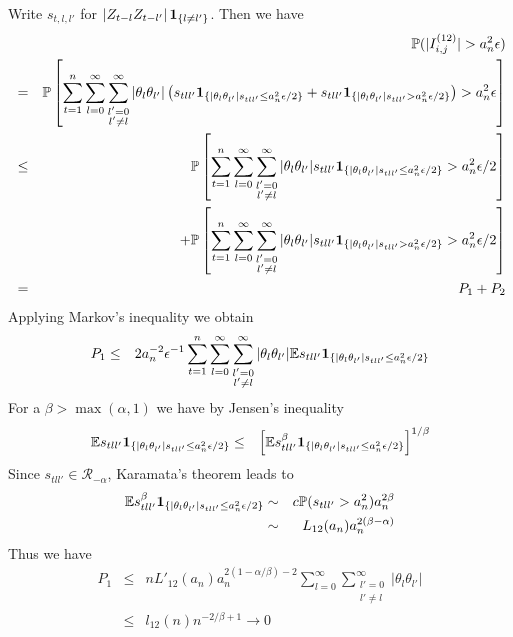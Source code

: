 \documentclass{article}
\begin{document}
Write $s_{t,l,l'}$ for $\left|Z_{t-l} Z_{t-l'}\right|\mathbf{1}_{\{l\neq
  l'\}}$. Then we have
\begin{eqnarray*}
  && \mathbb{P}(|I^{(12)}_{i,j}| > a_n^2 \epsilon) \\
  &=& \mathbb{P}\left[
    \sum_{t=1}^n \sum_{l=0}^\infty \sum_{\substack{l'=0 \\l'\neq
        l}}^\infty |\theta_l \theta_{l'}| \left(s_{tll'} \mathbf{1}_{\{|\theta_l \theta_{l'}|s_{tll'} \leq a_n^2
        \epsilon/2\}} + s_{tll'} \mathbf{1}_{\{|\theta_l \theta_{l'}|s_{tll'} > a_n^2
        \epsilon/2\}}\right) > a_n^2 \epsilon\right] \\
  &\leq& \mathbb{P}\left[
    \sum_{t=1}^n \sum_{l=0}^\infty \sum_{\substack{l'=0 \\l'\neq
        l}}^\infty |\theta_l \theta_{l'}|s_{tll'} \mathbf{1}_{\{|\theta_l \theta_{l'}|s_{tll'} \leq a_n^2 \epsilon/2\}} >
    a_n^2 \epsilon/2\right] \\
  && + \mathbb{P}\left[
    \sum_{t=1}^n \sum_{l=0}^\infty \sum_{\substack{l'=0 \\l'\neq
        l}}^\infty |\theta_l \theta_{l'}|s_{tll'} \mathbf{1}_{\{|\theta_l \theta_{l'}|s_{tll'} > a_n^2 \epsilon/2\}} >
    a_n^2 \epsilon/2\right] \\
  &=& P_1 + P_2
\end{eqnarray*}
Applying Markov's inequality we obtain
\begin{eqnarray*}
  P_1 &\leq& 2 a_n^{-2} \epsilon^{-1}
    \sum_{t=1}^n \sum_{l=0}^\infty \sum_{\substack{l'=0 \\l'\neq
        l}}^\infty |\theta_l \theta_{l'}| \mathbb{E} s_{tll'} \mathbf{1}_{\{|\theta_l
      \theta_{l'}|s_{tll'} \leq a_n^2 \epsilon/2\}}
\end{eqnarray*}
For a $\beta > \max(\alpha, 1)$ we have by Jensen's inequality
\begin{eqnarray*}
  \mathbb{E} s_{tll'} \mathbf{1}_{\{|\theta_l \theta_{l'}|s_{tll'} \leq a_n^2 \epsilon/2\}} &\leq&
  \left[
    \mathbb{E} s_{tll'}^{\beta} \mathbf{1}_{\{|\theta_l \theta_{l'}|s_{tll'} \leq a_n^2 \epsilon/2\}}
  \right]^{1/\beta}
\end{eqnarray*}
Since $s_{tll'} \in \mathcal R_{-\alpha}$, Karamata's theorem leads
to
\begin{eqnarray*}
  \mathbb{E} s_{tll'}^{\beta} \mathbf{1}_{\{|\theta_l \theta_{l'}|s_{tll'} \leq a_n^2 \epsilon/2\}} &\sim&
  c \mathbb{P}(s_{tll'} > a_n^2) a_n^{2\beta} \\
  &\sim& L_{12}(a_n) a_n^{2(\beta - \alpha)}
\end{eqnarray*}
Thus we have
\begin{eqnarray}
  P_1 &\leq& n L'_{12}(a_n) a_n^{2(1 - \alpha/\beta)-2}
  \sum_{l=0}^\infty \sum_{\substack{l'=0 \\l'\neq l}}^\infty |\theta_l
  \theta_{l'}| \nonumber \\
  &\leq& l_{12}(n) n^{-2/\beta + 1} \to 0 \label{eq:Jensen}
\end{eqnarray}
\end{document}
